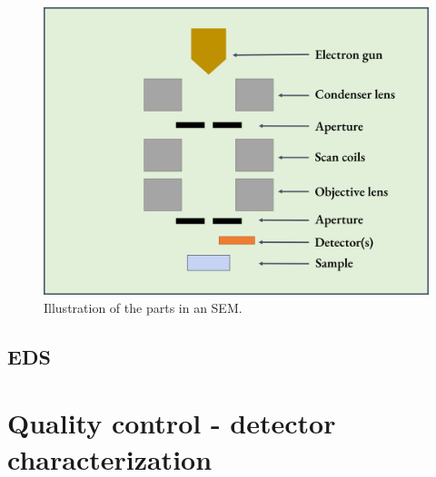 \begin{figure}[ht]
    \centering
    \includegraphics[width=0.8\linewidth]{figures/SEM_setup.png}
    \caption{
        Illustration of the parts in an SEM.
    }
    \label{fig:SEM_setup}
\end{figure}








\subsection{EDS}

















\section{Quality control - detector characterization}
\label{theory:qc}

